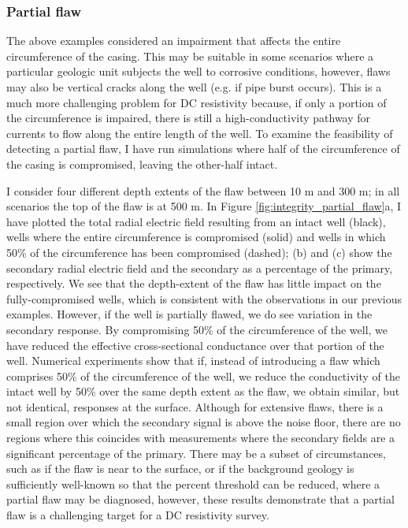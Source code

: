 





\subsubsection{Partial flaw}
The above examples considered an impairment that affects the entire circumference of the casing. This may be suitable in some scenarios where a particular geologic unit subjects the well to corrosive conditions, however, flaws may also be vertical cracks along the well (e.g. if pipe burst occurs). This is a much more challenging problem for DC resistivity because, if only a portion of the circumference is impaired, there is still a high-conductivity pathway for currents to flow along the entire length of the well. To examine the feasibility of detecting a partial flaw, I have run simulations where half of the circumference of the casing is compromised, leaving the other-half intact.

I consider four different depth extents of the flaw between 10 m and 300 m; in all scenarios the top of the flaw is at 500 m. In Figure \ref{fig:integrity_partial_flaw}a, I have plotted the total radial electric field resulting from an intact well (black), wells where the entire circumference is compromised (solid) and wells in which 50\% of the circumference has been compromised (dashed); (b) and (c) show the secondary radial electric field and the secondary as a percentage of the primary, respectively. We see that the depth-extent of the flaw has little impact on the fully-compromised wells, which is consistent with the observations in our previous examples. However, if the well is partially flawed, we do see variation in the secondary response. By compromising 50\% of the circumference of the well, we have reduced the effective cross-sectional conductance over that portion of the well. Numerical experiments show that if, instead of introducing a flaw which comprises 50\% of the circumference of the well, we reduce the conductivity of the intact well by 50\% over the same depth extent as the flaw, we obtain similar, but not identical, responses at the surface. Although for extensive flaws, there is a small region over which the secondary signal is above the noise floor, there are no regions where this coincides with measurements where the secondary fields are a significant percentage of the primary. There may be a subset of circumstances, such as if the flaw is near to the surface, or if the background geology is sufficiently well-known so that the percent threshold can be reduced, where a partial flaw may be diagnosed, however, these results demonstrate that a partial flaw is a challenging target for a DC resistivity survey.


